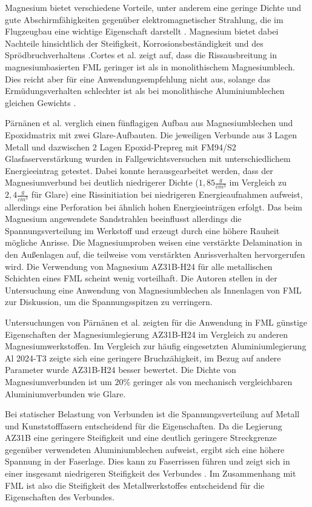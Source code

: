 Magnesium bietet verschiedene Vorteile, unter anderem eine geringe Dichte und gute Abschirmfähigkeiten gegenüber elektromagnetischer Strahlung, die im Flugzeugbau eine wichtige Eigenschaft darstellt \cite{Cortes.2005b}. Magnesium bietet dabei Nachteile hinsichtlich der Steifigkeit, Korrosionsbeständigkeit und des Sprödbruchverhaltens \cite{Cortes.2005b,Alderliesten.2008}.Cortes et al. \cite{Cortes.2005b} zeigt auf, dass die Rissausbreitung in magnesiumbasierten FML geringer ist als in monolithischem Magnesiumblech. Dies reicht aber für eine Anwendungsempfehlung nicht aus, solange das Ermüdungsverhalten schlechter ist als bei monolithische Aluminiumblechen gleichen Gewichts \cite{Alderliesten.2008}.

Pärnänen et al. \cite{Parnanen.2012} verglich einen fünflagigen Aufbau aus Magnesiumblechen und Epoxidmatrix mit zwei Glare-Aufbauten. Die jeweiligen Verbunde aus 3 Lagen Metall und dazwischen 2 Lagen Epoxid-Prepreg mit FM94/S2 Glasfaserverstärkung wurden in Fallgewichtsversuchen mit unterschiedlichem Energieeintrag getestet. 
Dabei konnte herausgearbeitet werden, dass der Magnesiumverbund bei deutlich niedrigerer Dichte ($1,85 \frac{g}{cm^3}$ im Vergleich zu $2,4 \frac{g}{cm^3}$ für Glare) eine Rissinitiation bei niedrigeren Energieaufnahmen aufweist, allerdings eine Perforation bei ähnlich hohen Energieeinträgen erfolgt.
Das beim Magnesium angewendete Sandstrahlen beeinflusst allerdings die Spannungsverteilung im Werkstoff und erzeugt durch eine höhere Rauheit mögliche Anrisse. Die Magnesiumproben weisen eine verstärkte Delamination in den Außenlagen auf, die teilweise vom verstärkten Anrissverhalten hervorgerufen wird. 
Die Verwendung von Magnesium AZ31B-H24 für alle metallischen Schichten eines FML scheint wenig vorteilhaft. Die Autoren stellen in der Untersuchung eine Anwendung von Magnesiumblechen als Innenlagen von FML zur Diskussion, um die Spannungsspitzen zu verringern. 

Untersuchungen von Pärnänen et al. \cite{Parnanen.2012} zeigten für die Anwendung in FML günstige Eigenschaften der Magnesiumlegierung AZ31B-H24 im Vergleich zu anderen Magnesiumwerkstoffen. Im Vergleich zur häufig eingesetzten Aluminiumlegierung Al 2024-T3 zeigte sich eine geringere Bruchzähigkeit, im Bezug auf andere Parameter wurde AZ31B-H24 besser bewertet. Die Dichte von Magnesiumverbunden ist um $20 \%$ geringer als von mechanisch vergleichbaren Aluminiumverbunden wie Glare.

Bei statischer Belastung von Verbunden ist die Spannungsverteilung auf Metall und Kunststofffasern entscheidend für die Eigenschaften. Da die Legierung AZ31B eine geringere Steifigkeit und eine deutlich geringere Streckgrenze gegenüber verwendeten Aluminiumblechen aufweist, ergibt sich eine höhere Spannung in der Faserlage. Dies kann zu Faserrissen führen und zeigt sich in einer insgesamt niedrigeren Steifigkeit des Verbundes \cite{Alderliesten.2008}.
Im Zusammenhang mit FML ist also die Steifigkeit des Metallwerkstoffes entscheidend für die Eigenschaften des Verbundes.


